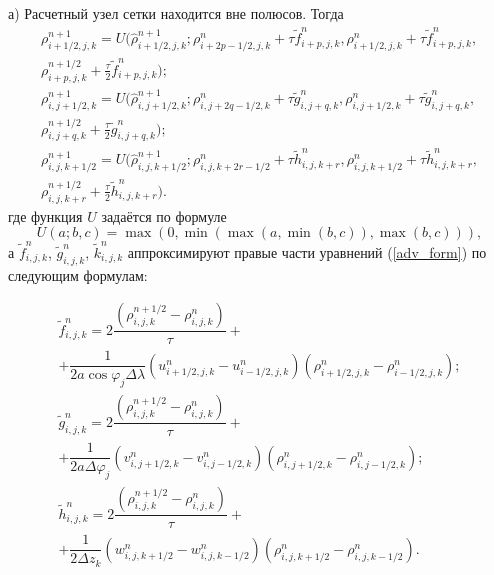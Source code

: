 \documentclass[14pt, a4paper]{extarticle}
\begin{document}
\begin{itemize}
а) Расчетный узел сетки находится вне полюсов. Тогда
\begin{gather}
\rho_{i+1/2, j, k}^{n+1} = U\bigg(\hat{\rho}_{i+1/2, j, k}^{n+1}; \rho_{i+2p-1/2, j, k}^n + \tau \tilde{f}_{i+p, j, k}^n, \rho_{i+1/2, j, k}^n + \tau \tilde{f}_{i+p, j, k}^n, \nonumber\\ \rho_{i+p, j, k}^{n+1/2}+\frac{\tau}{2}\tilde{f}_{i+p, j, k}^n\bigg);\nonumber\\
\rho_{i, j+1/2, k}^{n+1} = U\bigg(\hat{\rho}_{i, j+1/2, k}^{n+1}; \rho_{i, j+2q-1/2, k}^n + \tau \tilde{g}_{i, j+q, k}^n, \rho_{i, j+1/2, k}^n + \tau \tilde{g}_{i, j+q, k}^n, \nonumber\\ \rho_{i, j+q, k}^{n+1/2}+\frac{\tau}{2}\tilde{g}_{i, j+q, k}^n\bigg);\\
\rho_{i, j, k+1/2}^{n+1} = U\bigg(\hat{\rho}_{i, j, k+1/2}^{n+1}; \rho_{i, j, k+2r-1/2}^n + \tau \tilde{h}_{i, j, k+r}^n, \rho_{i, j, k+1/2}^n + \tau \tilde{h}_{i, j, k+r}^n, \nonumber\\ \rho_{i, j, k+r}^{n+1/2}+\frac{\tau}{2}\tilde{h}_{i, j, k+r}^n\bigg).\nonumber
\end{gather}
где функция $U$ задаётся по формуле
\begin{equation}
U(a; b, c) = \max\left(0, \min\left(\max(a, \min\left(b, c\right)),\max\left(b, c\right)\right)\right),
\end{equation}
а $\tilde{f}_{i, j, k}^n$, $\tilde{g}_{i, j, k}^n$, $\tilde{k}_{i, j, k}^n$ аппроксимируют правые части уравнений (\ref{adv_form}) по следующим формулам:

\begin{gather}
\tilde{f}_{i, j, k}^n = 2\dfrac{\left(\rho_{i, j, k}^{n+1/2} - \rho_{i, j, k}^n\right)}{\tau} + \nonumber\\ + \dfrac{1}{2a\cos\varphi_j \Delta\lambda}\left(u_{i+1/2, j, k}^n - u_{i-1/2, j, k}^n\right)\left(\rho_{i+1/2, j, k}^n - \rho_{i-1/2, j, k}^n\right);\nonumber \\
\tilde{g}_{i, j, k}^n = 2\dfrac{\left(\rho_{i, j, k}^{n+1/2} - \rho_{i, j, k}^n\right)}{\tau} + \nonumber\\ + \dfrac{1}{2a\Delta\varphi_j}            \left(v_{i, j+1/2, k}^n - v_{i, j-1/2, k}^n\right)\left(\rho_{i, j+1/2, k}^n - \rho_{i, j-1/2, k}^n\right); \\
\tilde{h}_{i, j, k}^n = 2\dfrac{\left(\rho_{i, j, k}^{n+1/2} - \rho_{i, j, k}^n\right)}{\tau} + \nonumber\\ + \dfrac{1}{2\Delta z_k}                  \left(w_{i, j, k+1/2}^n - w_{i, j, k-1/2}^n\right)\left(\rho_{i, j, k+1/2}^n - \rho_{i, j, k-1/2}^n\right)\nonumber.
\end{gather}


\end{itemize}
\end{document}
